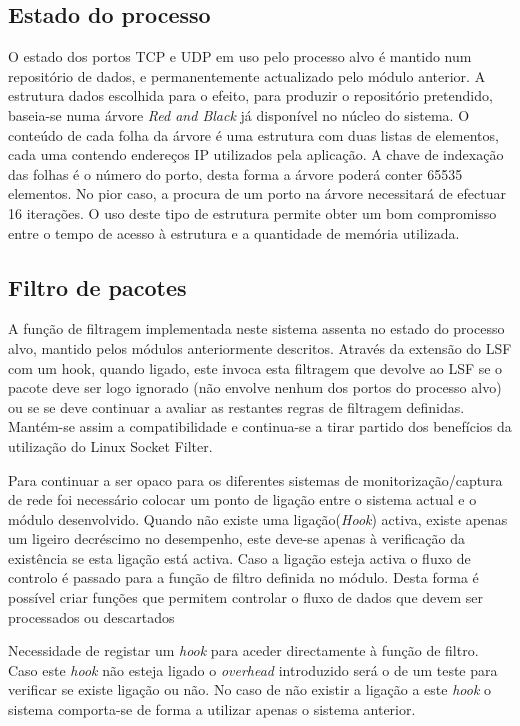 \subsection*{Estado do processo}
\label{sub:data_repository}

O estado dos portos TCP e UDP em uso pelo processo alvo é mantido num repositório de dados, e permanentemente actualizado pelo módulo anterior. 
 A estrutura dados escolhida para o efeito, para produzir o repositório pretendido, baseia-se numa árvore \textit{Red and Black} já disponível no núcleo do sistema. O conteúdo de cada folha da árvore é uma estrutura com duas listas de elementos, cada uma contendo endereços IP utilizados pela aplicação. A chave de indexação das folhas é o número do porto, desta forma a árvore poderá conter 65535 elementos. No pior caso, a procura de um porto na árvore necessitará de efectuar 16 iterações.
  O uso deste tipo de estrutura permite obter um bom compromisso entre o tempo de acesso à estrutura e a quantidade de memória utilizada.


\subsection*{Filtro de pacotes}
\label{sub:packet_filter}

A função de filtragem  implementada neste sistema assenta no estado do processo alvo, mantido pelos módulos anteriormente descritos.
Através da extensão do LSF com um hook, quando ligado, este invoca esta filtragem que devolve ao LSF se o pacote deve ser logo ignorado (não envolve nenhum dos portos do processo alvo) ou se se deve continuar a avaliar as restantes regras de filtragem definidas.
 Mantém-se assim a compatibilidade e continua-se a tirar partido dos benefícios da utilização do Linux Socket Filter.

Para continuar a ser opaco para os diferentes sistemas de monitorização/captura de rede foi necessário colocar um ponto de ligação entre o sistema actual e o módulo desenvolvido.
 Quando não existe uma ligação(\textit{Hook}) activa, existe apenas um ligeiro decréscimo no desempenho, este deve-se apenas à verificação da existência se esta ligação está activa.
 Caso a ligação esteja activa o fluxo de controlo é passado para a função de filtro definida no módulo.
 Desta forma é possível criar funções que permitem controlar o fluxo de dados que devem ser processados ou descartados

Necessidade de registar um \textit{hook} para aceder directamente à função de filtro.
 Caso este \textit{hook} não esteja ligado o \textit{overhead} introduzido será o de um teste para verificar se existe ligação ou não.
 No caso de não existir a ligação a este \textit{hook} o sistema comporta-se de forma a utilizar apenas o sistema anterior.

